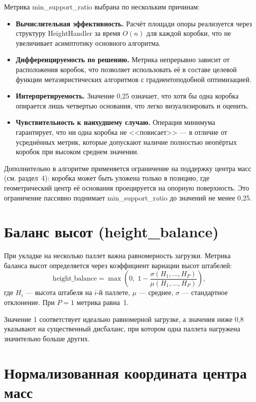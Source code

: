 Метрика min\_support\_ratio выбрана по нескольким причинам:
\begin{itemize}
  \item \textbf{Вычислительная эффективность.} Расчёт площади опоры реализуется через структуру HeightHandler за время $O(n)$ для каждой коробки, что не увеличивает асимптотику основного алгоритма.
  \item \textbf{Дифференцируемость по решению.} Метрика непрерывно зависит от расположения коробок, что позволяет использовать её в составе целевой функции метаэвристических алгоритмов с градиентоподобной оптимизацией.
  \item \textbf{Интерпретируемость.} Значение 0,25 означает, что хотя бы одна коробка опирается лишь четвертью основания, что легко визуализировать и оценить.
  \item \textbf{Чувствительность к наихудшему случаю.} Операция минимума гарантирует, что ни одна коробка не <<повисает>> --- в отличие от усреднённых метрик, которые допускают наличие полностью неопёртых коробок при высоком среднем значении.
\end{itemize}

Дополнительно в алгоритме применяется ограничение на поддержку центра масс (см. раздел~4): коробка может быть уложена только в позицию, где геометрический центр её основания проецируется на опорную поверхность. Это ограничение пассивно поднимает min\_support\_ratio до значений не менее 0,25.

\section{Баланс высот (height\_balance)}
\label{sec:metric_hb}

При укладке на несколько паллет важна равномерность загрузки. Метрика баланса высот определяется через коэффициент вариации высот штабелей:
\[
\text{height\_balance} = \max\!\left(0,\; 1 - \frac{\sigma(H_1, \ldots, H_P)}{\mu(H_1, \ldots, H_P)}\right),
\]
где $H_i$ --- высота штабеля на $i$-й паллете, $\mu$ --- среднее, $\sigma$ --- стандартное отклонение. При $P = 1$ метрика равна~1.

Значение 1 соответствует идеально равномерной загрузке, а значения ниже 0,8 указывают на существенный дисбаланс, при котором одна паллета нагружена значительно больше других.

\section{Нормализованная координата центра масс}
\label{sec:metric_com}

